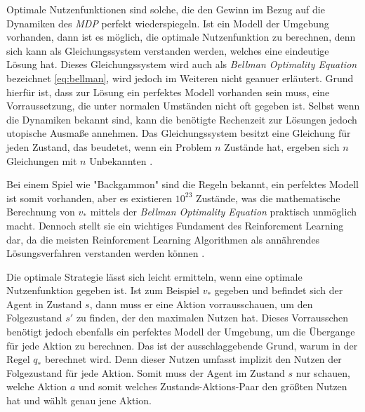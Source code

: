 Optimale Nutzenfunktionen sind solche, die den Gewinn im Bezug auf die Dynamiken des \textit{MDP} perfekt wiederspiegeln. Ist ein Modell der Umgebung vorhanden, dann ist es möglich, die optimale Nutzenfunktion zu berechnen, denn sich kann als Gleichungssystem verstanden werden, welches eine eindeutige Lösung hat. Dieses Gleichungssystem wird auch als \textit{Bellman Optimality Equation }bezeichnet \eqref{eq:bellman}, wird jedoch im Weiteren nicht geanuer erläutert. Grund hierfür ist, dass zur Lösung ein perfektes Modell vorhanden sein muss, eine Vorraussetzung, die unter normalen Umständen nicht oft gegeben ist. Selbst wenn die Dynamiken bekannt sind, kann die benötigte Rechenzeit zur Lösungen jedoch utopische Ausmaße annehmen. Das Gleichungssystem besitzt eine Gleichung für jeden Zustand, das beudetet, wenn ein Problem $n$ Zustände hat, ergeben sich $n$ Gleichungen mit $n$ Unbekannten \cite[S.~64]{Sutton1998}. 
\par
Bei einem Spiel wie "Backgammon" sind die Regeln bekannt, ein perfektes Modell ist somit vorhanden, aber es existieren $10^23$ Zustände, was die mathematische Berechnung von $v_*$ mittels der \textit{Bellman Optimality Equation} praktisch unmöglich macht. Dennoch stellt sie ein wichtiges Fundament des Reinforcment Learning dar, da die meisten Reinforcment Learning Algorithmen als annährendes Lösungsverfahren verstanden werden können \cite[S.~66]{Sutton1998}.
\par 
Die optimale Strategie lässt sich leicht ermitteln, wenn eine optimale Nutzenfunktion gegeben ist. Ist zum Beispiel $v_*$ gegeben und befindet sich der Agent in Zustand $s$, dann muss er eine Aktion vorrausschauen, um den Folgezustand $s'$ zu finden, der den maximalen Nutzen hat. Dieses Vorrausschen benötigt jedoch ebenfalls ein perfektes Modell der Umgebung, um die Übergange für jede Aktion zu berechnen. Das ist der ausschlaggebende Grund, warum in der Regel $q_*$ berechnet wird. Denn dieser Nutzen umfasst implizit den Nutzen der Folgezustand für jede Aktion. Somit muss der Agent im Zustand $s$ nur schauen, welche Aktion $a$ und somit welches Zustands-Aktions-Paar den größten Nutzen hat und wählt genau jene Aktion.
\par 
